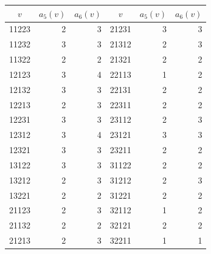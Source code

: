 \begin{center}
\begin{tabular}{crr@{\qquad\qquad}crr}
\toprule
$v$ & $a_5(v)$ & $a_6(v)$ & $v$ & $a_5(v)$ & $a_6(v)$\\
\midrule
11223 & 2 & 3 & 21231 & 3 & 3\\
11232 & 3 & 3 & 21312 & 2 & 3\\
11322 & 2 & 2 & 21321 & 2 & 2\\
12123 & 3 & 4 & 22113 & 1 & 2\\
12132 & 3 & 3 & 22131 & 2 & 2\\
12213 & 2 & 3 & 22311 & 2 & 2\\
12231 & 3 & 3 & 23112 & 2 & 3\\
12312 & 3 & 4 & 23121 & 3 & 3\\
12321 & 3 & 3 & 23211 & 2 & 2\\
13122 & 3 & 3 & 31122 & 2 & 2\\
13212 & 2 & 3 & 31212 & 2 & 3\\
13221 & 2 & 2 & 31221 & 2 & 2\\
21123 & 2 & 3 & 32112 & 1 & 2\\
21132 & 2 & 2 & 32121 & 2 & 2\\
21213 & 2 & 3 & 32211 & 1 & 1\\
\bottomrule
\end{tabular}
\end{center}
